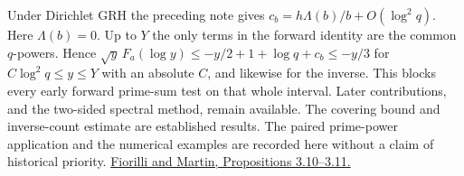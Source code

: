 \documentclass[11pt,a4paper]{article}
\begin{document}
Under Dirichlet GRH the preceding note gives
\(c_b=h\Lambda(b)/b+O(\log^2q)\). Here \(\Lambda(b)=0\). Up to \(Y\) the
only terms in the forward identity are the common \(q\)-powers. Hence
\(\sqrt y\,F_a(\log y)\le-y/2+1+\log q+c_b\le-y/3\)
for \(C\log^2q\le y\le Y\) with an absolute \(C\), and likewise for the
inverse. This blocks every early forward prime-sum test on that whole
interval. Later contributions, and the two-sided spectral method, remain
available. The covering bound and inverse-count estimate are established
results. The paired prime-power application and the numerical examples are
recorded here without a claim of historical priority.
\href{https://arxiv.org/pdf/0912.4908#page=31}{Fiorilli and Martin, Propositions 3.10--3.11.}
\end{document}
